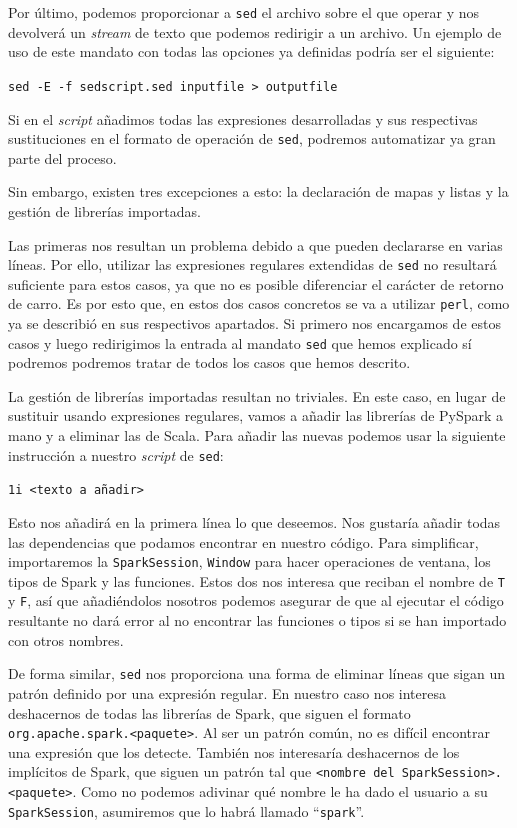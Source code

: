 \documentclass[12pt,twoside,titlepage]{report}
\newcommand{\quotes}[1]{``#1''}
\begin{document}
Por último, podemos proporcionar a \texttt{sed} el archivo sobre el que operar y nos devolverá un \textit{stream} de texto que podemos redirigir a un archivo. Un ejemplo de uso de este mandato con todas las opciones ya definidas podría ser el siguiente:

\texttt{sed -E -f sedscript.sed inputfile > outputfile}

Si en el \textit{script} añadimos todas las expresiones desarrolladas y sus respectivas sustituciones en el formato de operación de \texttt{sed}, podremos automatizar ya gran parte del proceso.

Sin embargo, existen tres excepciones a esto: la declaración de mapas y listas y la gestión de librerías importadas. 

Las primeras nos resultan un problema debido a que pueden declararse en varias líneas. Por ello, utilizar las expresiones regulares extendidas de \texttt{sed} no resultará suficiente para estos casos, ya que no es posible diferenciar el carácter de retorno de carro. Es por esto que, en estos dos casos concretos se va a utilizar \texttt{perl}, como ya se describió en sus respectivos apartados. Si primero nos encargamos de estos casos y luego redirigimos la entrada al mandato \texttt{sed} que hemos explicado sí podremos podremos tratar de todos los casos que hemos descrito.

La gestión de librerías importadas resultan no triviales. En este caso, en lugar de sustituir usando expresiones regulares, vamos a añadir las librerías de PySpark a mano y a eliminar las de Scala. Para añadir las nuevas podemos usar la siguiente instrucción a nuestro \textit{script} de \texttt{sed}:

\texttt{1i <texto a añadir>}

Esto nos añadirá en la primera línea lo que deseemos. Nos gustaría añadir todas las dependencias que podamos encontrar en nuestro código. Para simplificar, importaremos la \texttt{SparkSession}, \texttt{Window} para hacer operaciones de ventana, los tipos de Spark y las funciones. Estos dos nos interesa que reciban el nombre de \texttt{T} y \texttt{F}, así que añadiéndolos nosotros podemos asegurar de que al ejecutar el código resultante no dará error al no encontrar las funciones o tipos si se han importado con otros nombres.

De forma similar, \texttt{sed} nos proporciona una forma de eliminar líneas que sigan un patrón definido por una expresión regular. En nuestro caso nos interesa deshacernos de todas las librerías de Spark, que siguen el formato \texttt{org.apache.spark.<paquete>}. Al ser un patrón común, no es difícil encontrar una expresión que los detecte. También nos interesaría deshacernos de los implícitos de Spark, que siguen un patrón tal que \texttt{<nombre del SparkSession>.<paquete>}. Como no podemos adivinar qué nombre le ha dado el usuario a su \texttt{SparkSession}, asumiremos que lo habrá llamado \quotes{\texttt{spark}}.
\end{document}
